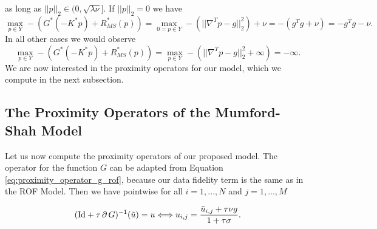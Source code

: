         as long as $||p||_{2} \in (0, \sqrt{\lambda \nu}]$. If $||p||_{2} = 0$ we have
            $$
                \max_{p \in Y} - (G^{\ast}(-K^{\ast}p) + R_{MS}^{\ast}(p)) = \max_{0 = p \in Y} -(||\nabla^{T}p - g||_{2}^{2}) + \nu = -(g^{T}g + \nu) = -g^{T}g - \nu.
            $$
        In all other cases we would observe
            $$
                \max_{p \in Y} - (G^{\ast}(-K^{\ast}p) + R_{MS}^{\ast}(p)) = \max_{p \in Y} -(||\nabla^{T}p - g||_{2}^{2} + \infty) = -\infty.
            $$
        We are now interested in the proximity operators for our model, which we compute in the next subsection.


    \subsection{The Proximity Operators of the Mumford-Shah Model} %
    \label{sub:the_proximity_operators_of_the_mumford_shah_model}
        
        Let us now compute the proximity operators of our proposed model. The operator for the function $G$ can be adapted from Equation \ref{eq:proximity_operator_g_rof}, because our data fidelity term is the same as in the ROF Model. Then we have pointwise for all $i = 1, ..., N$ and $j = 1, ..., M$

            \begin{equation}
                (\textnormal{Id} + \tau\,\partial\,G)^{-1}(\tilde{u}) = u \Longleftrightarrow u_{i,j} = \frac{\tilde{u}_{i,j} + \tau\nu g}{1 + \tau\sigma}.
            \label{eq:proximity_operator_g_mumford_shah}
            \end{equation}

